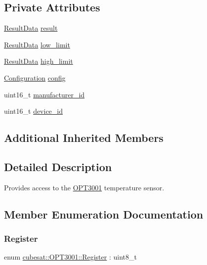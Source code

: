 \subsection*{Private Attributes}
\begin{DoxyCompactItemize}
\item 
\hyperlink{unioncubesat_1_1OPT3001_1_1ResultData}{Result\+Data} \hyperlink{classcubesat_1_1OPT3001_a7eee3af72ef6914189ba433416388a8f}{result}
\item 
\hyperlink{unioncubesat_1_1OPT3001_1_1ResultData}{Result\+Data} \hyperlink{classcubesat_1_1OPT3001_a199e1dbf3a86211403e3f9bd286c27c5}{low\+\_\+limit}
\item 
\hyperlink{unioncubesat_1_1OPT3001_1_1ResultData}{Result\+Data} \hyperlink{classcubesat_1_1OPT3001_a8845a818c246527edaa414ddf59ff9a6}{high\+\_\+limit}
\item 
\hyperlink{unioncubesat_1_1OPT3001_1_1Configuration}{Configuration} \hyperlink{classcubesat_1_1OPT3001_acf76526638ac9210adb947fa6b4b155f}{config}
\item 
uint16\+\_\+t \hyperlink{classcubesat_1_1OPT3001_a5b5aa666cb00efe6f26d440965d055a7}{manufacturer\+\_\+id}
\item 
uint16\+\_\+t \hyperlink{classcubesat_1_1OPT3001_ab7240590fe1e63a4b4884ccdd603c243}{device\+\_\+id}
\end{DoxyCompactItemize}
\subsection*{Additional Inherited Members}


\subsection{Detailed Description}
Provides access to the \hyperlink{classcubesat_1_1OPT3001}{O\+P\+T3001} temperature sensor. 

\subsection{Member Enumeration Documentation}
\mbox{\label{classcubesat_1_1OPT3001_af8ded2d0275e87105725928dc0485ad7}} 
\subsubsection{\texorpdfstring{Register}{Register}}
{\footnotesize\ttfamily enum \hyperlink{classcubesat_1_1OPT3001_af8ded2d0275e87105725928dc0485ad7}{cubesat\+::\+O\+P\+T3001\+::\+Register} \+: uint8\+\_\+t\hspace{0.3cm}{\ttfamily [strong]}}



